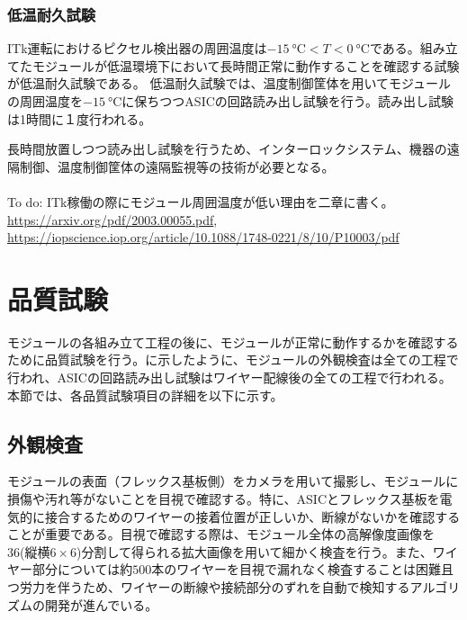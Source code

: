 \subsubsection*{低温耐久試験}

ITk運転におけるピクセル検出器の周囲温度は$-15\ \si{\degreeCelsius}<T<0\ \si{\degreeCelsius}$である。組み立てたモジュールが低温環境下において長時間正常に動作することを確認する試験が低温耐久試験である。
低温耐久試験では、温度制御筐体を用いてモジュールの周囲温度を$-15\ \si{\degreeCelsius}$に保ちつつASICの回路読み出し試験を行う。読み出し試験は1時間に１度行われる。

長時間放置しつつ読み出し試験を行うため、インターロックシステム、機器の遠隔制御、温度制御筐体の遠隔監視等の技術が必要となる。
\\
\\
To do: ITk稼働の際にモジュール周囲温度が低い理由を二章に書く。\\
\url{https://arxiv.org/pdf/2003.00055.pdf}, \\
\url{https://iopscience.iop.org/article/10.1088/1748-0221/8/10/P10003/pdf}
\\

\section{品質試験}
\label{sec:QCtest}

モジュールの各組み立て工程の後に、モジュールが正常に動作するかを確認するために品質試験を行う。に示したように、モジュールの外観検査は全ての工程で行われ、ASICの回路読み出し試験はワイヤー配線後の全ての工程で行われる。本節では、各品質試験項目の詳細を以下に示す。

\subsection{外観検査}

モジュールの表面（フレックス基板側）をカメラを用いて撮影し、モジュールに損傷や汚れ等がないことを目視で確認する。特に、ASICとフレックス基板を電気的に接合するためのワイヤーの接着位置が正しいか、断線がないかを確認することが重要である。目視で確認する際は、モジュール全体の高解像度画像を36(縦横$6\times6$)分割して得られる拡大画像を用いて細かく検査を行う。また、ワイヤー部分については約$500$本のワイヤーを目視で漏れなく検査することは困難且つ労力を伴うため、ワイヤーの断線や接続部分のずれを自動で検知するアルゴリズムの開発が進んでいる。


